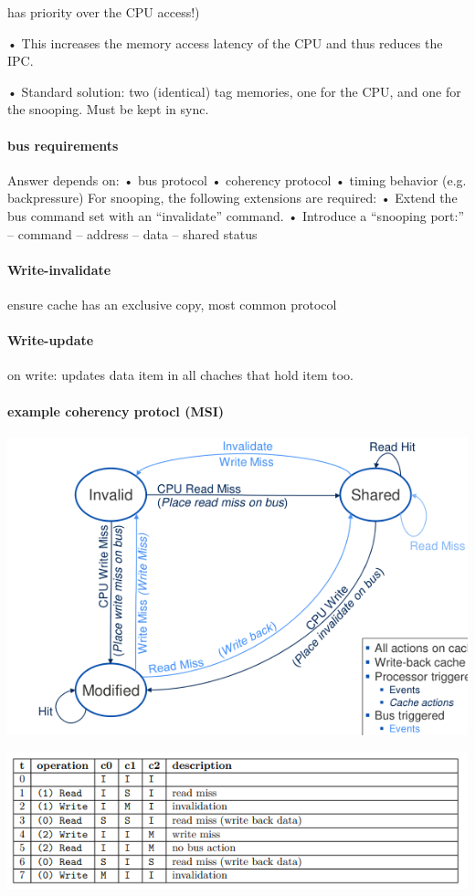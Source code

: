 \documentclass[fontsize=8pt]{scrartcl}
\begin{document}
\begin{multicols*}{4}
has priority over the CPU access!)

• This increases the memory access latency of the CPU and thus reduces the IPC.

• Standard solution: two (identical) tag memories, one for the CPU, and one for the snooping. Must be kept in sync.

\paragraph{bus requirements}
Answer depends on:
• bus protocol
• coherency protocol
• timing behavior (e.g. backpressure)
For snooping, the following extensions are required:
• Extend the bus command set with an “invalidate” command.
• Introduce a “snooping port:”
– command
– address
– data
– shared status

\paragraph{Write-invalidate} ensure cache has an exclusive copy, most common protocol

\paragraph{Write-update} on write: updates data item in all chaches that hold item too.

\paragraph{example coherency protocl (MSI)}

\begin{center}
  \includegraphics[width=0.8\linewidth]{img/MSIDiagram.png}
  \label{fig:msidiagram}
\end{center}

\begin{center}
  \centering
  \includegraphics[width=0.8\linewidth]{img/msiExercise.png}
  \label{fig:msiexercise}
\end{center}


\end{multicols*}
\end{document}

